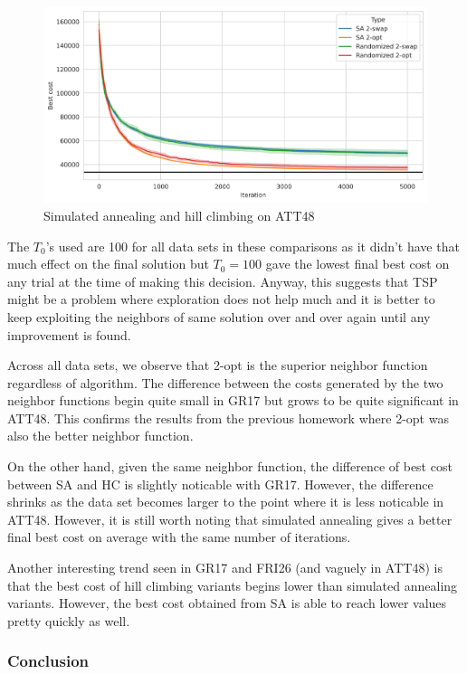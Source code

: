 \begin{figure}
    \centering
    \includegraphics[height=0.27\textheight]{images/att48-with-hc.png}
    \caption{Simulated annealing and hill climbing on ATT48}
    \label{fig:att48}
\end{figure}

The \(T_0\)'s used are 100 for all data sets in these comparisons as it didn't have that much effect on the final solution but \(T_0=100\) gave the lowest final best cost on any trial at the time of making this decision. Anyway, this suggests that TSP might be a problem where exploration does not help much and it is better to keep exploiting the neighbors of same solution over and over again until any improvement is found.

Across all data sets, we observe that 2-opt is the superior neighbor function regardless of algorithm. The difference between the costs generated by the two neighbor functions begin quite small in GR17 but grows to be quite significant in ATT48. This confirms the results from the previous homework where 2-opt was also the better neighbor function.

On the other hand, given the same neighbor function, the difference of best cost between SA and HC is slightly noticable with GR17. However, the difference shrinks as the data set becomes larger to the point where it is less noticable in ATT48. However, it is still worth noting that simulated annealing gives a better final best cost on average with the same number of iterations.

Another interesting trend seen in GR17 and FRI26 (and vaguely in ATT48) is that the best cost of hill climbing variants begins lower than simulated annealing variants. However, the best cost obtained from SA is able to reach lower values pretty quickly as well.

\subsubsection*{Conclusion}

